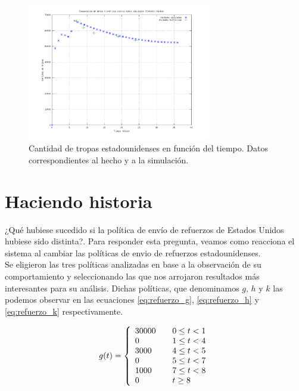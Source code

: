 \documentclass{sig-alternate}
\begin{document}
\begin{figure}[h]
\begin{center}
\includegraphics[width=8cm]{real_vs_sim.png}
\caption{\label{fig:realvssim}Cantidad de tropas estadounidenses en función del tiempo. Datos correspondientes al hecho y a la simulación.}
\end{center}
\end{figure}

\newpage

\section{Haciendo historia}

¿Qué hubiese sucedido si la política de envío de refuerzos de Estados Unidos hubiese sido distinta?. Para responder esta pregunta, veamos como
reacciona el sistema al cambiar las políticas de envio de refuerzos estadounidenses.\\
Se eligieron las tres políticas analizadas en base a la observación de su comportamiento y seleccionando las que nos arrojaron resultados
más interesantes para su análisis. Dichas políticas, que denominamos $g$, $h$ y $k$ las podemos observar en las ecuaciones \eqref{eq:refuerzo_g}, 
\eqref{eq:refuerzo_h} y \eqref{eq:refuerzo_k} respectivamente.

\begin{equation}
g(t) = \left\{ 
    \begin{array}{l l}
    30000 & \quad 0 \leq t < 1 \\
    0 & \quad 1 \leq t < 4\\
    3000 & \quad 4 \leq t < 5\\
    0 & \quad 5 \leq t < 7\\
    1000 & \quad 7 \leq t < 8\\
    0 & \quad t \geq 8\\
    \end{array} \right.
\label{eq:refuerzo_g}
\end{equation}
\end{document}

